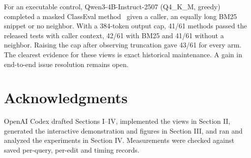 \documentclass[conference]{IEEEtran}
\begin{document}
For an executable control, Qwen3-4B-Instruct-2507 (Q4\_K\_M, greedy) completed a masked ClassEval method~\cite{classeval} given a caller, an equally long BM25 snippet or no neighbor. With a 384-token output cap, 41/61 methods passed the released tests with caller context, 42/61 with BM25 and 41/61 without a neighbor. Raising the cap after observing truncation gave 43/61 for every arm. The clearest evidence for these views is exact historical maintenance. A gain in end-to-end issue resolution remains open.

\section*{Acknowledgments}
OpenAI Codex drafted Sections I--IV, implemented the views in Section II, generated the interactive demonstration and figures in Section III, and ran and analyzed the experiments in Section IV. Measurements were checked against saved per-query, per-edit and timing records.


\end{document}
